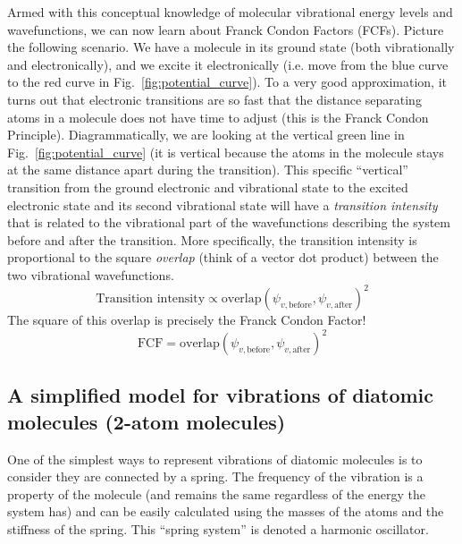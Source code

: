 \documentclass[12pt]{article}
\begin{document}
Armed with this conceptual knowledge of molecular vibrational energy levels and wavefunctions, we can now learn about Franck Condon Factors (FCFs). Picture the following scenario. We have a molecule in its ground state (both vibrationally and electronically), and we excite it electronically (i.e. move from the blue curve to the red curve in Fig.~\ref{fig:potential_curve}). To a very good approximation, it turns out that electronic transitions are so fast that the distance separating atoms in a molecule does not have time to adjust (this is the Franck Condon Principle). Diagrammatically, we are looking at the vertical green line in Fig.~\ref{fig:potential_curve} (it is vertical because the atoms in the molecule stays at the same distance apart during the transition). This specific ``vertical'' transition from the ground electronic and vibrational state to the excited electronic state and its second vibrational state will have a \textit{transition intensity} that is related to the vibrational part of the wavefunctions describing the system before and after the transition. More specifically, the transition intensity is proportional to the square \textit{overlap} (think of a vector dot product) between the two vibrational wavefunctions.
\begin{equation}
    \text{Transition}\text{ intensity} \propto \text{overlap}(\psi_{v,\text{before}},\psi_{v,\text{after}})^2
\end{equation}
The square of this overlap is precisely the Franck Condon Factor!
\begin{equation}
    \text{FCF} = \text{overlap}(\psi_{v,\text{before}},\psi_{v,\text{after}})^2
\end{equation}

\subsection{A simplified model for vibrations of diatomic molecules (2-atom molecules)}
One of the simplest ways to represent vibrations of diatomic molecules is to consider they are connected by a spring. The frequency of the vibration is a property of the molecule (and remains the same regardless of the energy the system has) and can be easily calculated using the masses of the atoms and the stiffness of the spring. This ``spring system'' is denoted a harmonic oscillator.
\end{document}
